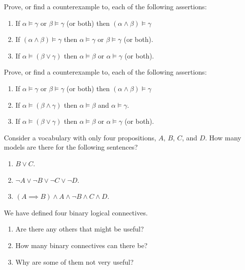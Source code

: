 \begin{iexercise}%
Prove, or find a counterexample to, each of the following assertions:
\begin{enumerate}
\item  If \(\alpha\models\gamma\) or \(\beta\models\gamma\) (or both) then \((\alpha\land \beta)\models\gamma\)
\item  If \((\alpha\land \beta)\models\gamma\) then \(\alpha\models\gamma\) or \(\beta\models\gamma\) (or both).
\item  If \(\alpha\models (\beta \lor \gamma)\) then \(\alpha \models \beta\) or \(\alpha \models \gamma\) (or both).
\end{enumerate}
\end{iexercise} 

\begin{uexercise}%
Prove, or find a counterexample to, each of the following assertions:
\begin{enumerate}
\item  If \(\alpha\models\gamma\) or \(\beta\models\gamma\) (or both) then \((\alpha\land \beta)\models\gamma\)
\item  If \(\alpha\models (\beta \land \gamma)\) then \(\alpha \models \beta\) and \(\alpha \models \gamma\).
\item  If \(\alpha\models (\beta \lor \gamma)\) then \(\alpha \models \beta\) or \(\alpha \models \gamma\) (or both).
\end{enumerate}
\end{uexercise} 

\begin{exercise}
Consider a vocabulary with only four propositions, \(A\), \(B\), \(C\), and
\(D\).  How many models are there for the following sentences?
\begin{enumerate}
\item \(B\lor C\).
\item \(\lnot A\lor \lnot B \lor \lnot C \lor \lnot D\).
\item \((A\implies B) \land A \land \lnot B \land C \land D\).
\end{enumerate}
\end{exercise} 

\begin{exercise}
We have defined four  binary logical connectives.  
\begin{enumerate}
\item Are there any others that might be useful?  
\item How many binary connectives can there be?  
\item Why are some of them not very useful?
\end{enumerate}
\end{exercise} 

